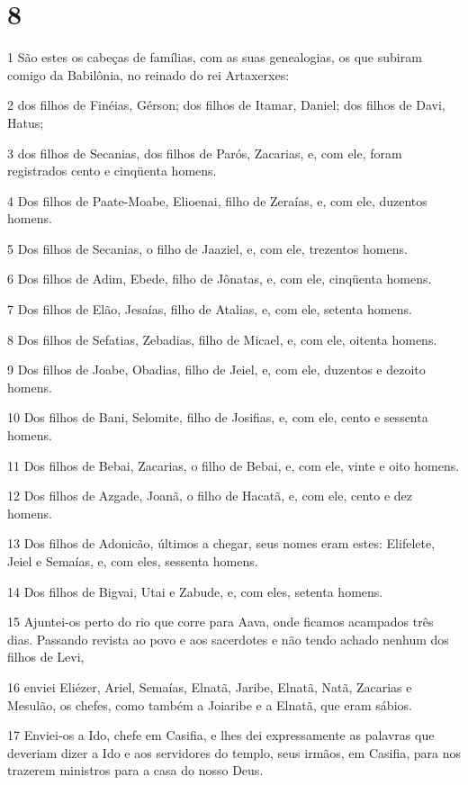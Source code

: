 \chapter{8}

\par 1 São estes os cabeças de famílias, com as suas genealogias, os que subiram comigo da Babilônia, no reinado do rei Artaxerxes:
\par 2 dos filhos de Finéias, Gérson; dos filhos de Itamar, Daniel; dos filhos de Davi, Hatus;
\par 3 dos filhos de Secanias, dos filhos de Parós, Zacarias, e, com ele, foram registrados cento e cinqüenta homens.
\par 4 Dos filhos de Paate-Moabe, Elioenai, filho de Zeraías, e, com ele, duzentos homens.
\par 5 Dos filhos de Secanias, o filho de Jaaziel, e, com ele, trezentos homens.
\par 6 Dos filhos de Adim, Ebede, filho de Jônatas, e, com ele, cinqüenta homens.
\par 7 Dos filhos de Elão, Jesaías, filho de Atalias, e, com ele, setenta homens.
\par 8 Dos filhos de Sefatias, Zebadias, filho de Micael, e, com ele, oitenta homens.
\par 9 Dos filhos de Joabe, Obadias, filho de Jeiel, e, com ele, duzentos e dezoito homens.
\par 10 Dos filhos de Bani, Selomite, filho de Josifias, e, com ele, cento e sessenta homens.
\par 11 Dos filhos de Bebai, Zacarias, o filho de Bebai, e, com ele, vinte e oito homens.
\par 12 Dos filhos de Azgade, Joanã, o filho de Hacatã, e, com ele, cento e dez homens.
\par 13 Dos filhos de Adonicão, últimos a chegar, seus nomes eram estes: Elifelete, Jeiel e Semaías, e, com eles, sessenta homens.
\par 14 Dos filhos de Bigvai, Utai e Zabude, e, com eles, setenta homens.
\par 15 Ajuntei-os perto do rio que corre para Aava, onde ficamos acampados três dias. Passando revista ao povo e aos sacerdotes e não tendo achado nenhum dos filhos de Levi,
\par 16 enviei Eliézer, Ariel, Semaías, Elnatã, Jaribe, Elnatã, Natã, Zacarias e Mesulão, os chefes, como também a Joiaribe e a Elnatã, que eram sábios.
\par 17 Enviei-os a Ido, chefe em Casifia, e lhes dei expressamente as palavras que deveriam dizer a Ido e aos servidores do templo, seus irmãos, em Casifia, para nos trazerem ministros para a casa do nosso Deus.
